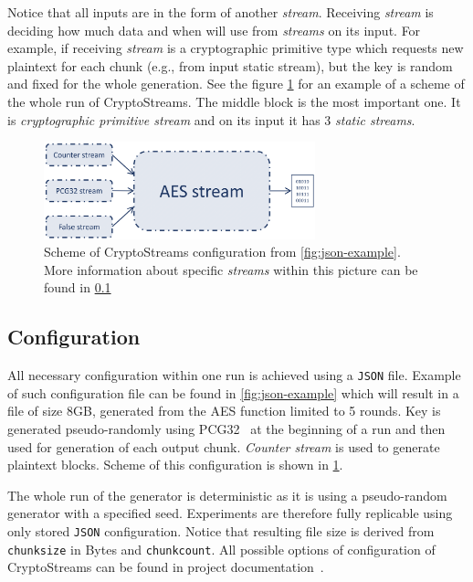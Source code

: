 \documentclass[
    digital,    %
    oneside,    %
    color,
    11pt,
    nocover,
    notable,
    nolof,
    nolot,
    final
]{fithesis3}
\renewcommand\_{\textunderscore\allowbreak}
\begin{document}
Notice that all inputs are in the form of another \textit{stream}. Receiving \textit{stream} is deciding how much data and when will use from \textit{streams} on its input. For example, if receiving \textit{stream} is a cryptographic primitive type which requests new plaintext for each chunk (e.g., from input static stream), but the key is random and fixed for the whole generation. See the figure \cref{fig:config-schema} for an example of a scheme of the whole run of CryptoStreams. The middle block is the most important one. It is \textit{cryptographic primitive stream} and on its input it has 3 \textit{static streams}.

\begin{figure}[h]
	\centering
	\includegraphics[width=0.7\textwidth]{./images/pictures/config-schema.png}
	\caption{Scheme of CryptoStreams configuration from \cref{fig:json-example}. More information about specific \textit{streams} within this picture can be found in \cref{subsec:configuration} }
	\label{fig:config-schema}
\end{figure}


\subsection{Configuration}
\label{subsec:configuration}

All necessary configuration within one run is achieved using a \texttt{JSON} file. Example of such configuration file can be found in \cref{fig:json-example} which will result in a file of size 8GB, generated from the AES function limited to 5 rounds. Key is generated pseudo-randomly using PCG32~\cite{pcgGen} at the beginning of a run and then used for generation of each output chunk. \textit{Counter stream} is used to generate plaintext blocks. Scheme of this configuration is shown in \cref{fig:config-schema}. 

The whole run of the generator is deterministic as it is using a pseudo-random generator with a specified seed. Experiments are therefore fully replicable using only stored \texttt{JSON} configuration. Notice that resulting file size is derived from \texttt{chunk\_size} in Bytes and \texttt{chunk\_count}. All possible options of configuration of CryptoStreams can be found in project documentation~\cite{CryptoStreams-wiki}.
\end{document}
